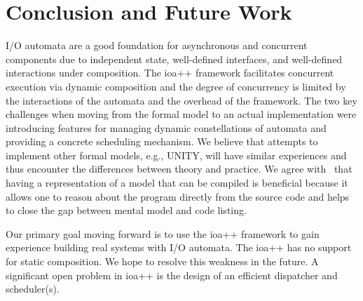 \section{Conclusion and Future Work\label{conclusion}}

I/O automata are a good foundation for asynchronous and concurrent components due to independent state, well-defined interfaces, and well-defined interactions under composition.
The ioa++ framework facilitates concurrent execution via dynamic composition and the degree of concurrency is limited by the interactions of the automata and the overhead of the framework.
The two key challenges when moving from the formal model to an actual implementation were introducing features for managing dynamic constellations of automata and providing a concrete scheduling mechanism.
We believe that attempts to implement other formal models, e.g., UNITY, will have similar experiences and thus encounter the differences between theory and practice.
We agree with~\cite{georgiou2009automated} that having a representation of a model that can be compiled is beneficial because it allows one to reason about the program directly from the source code and helps to close the gap between mental model and code listing.

Our primary goal moving forward is to use the ioa++ framework to gain experience building real systems with I/O automata.
The ioa++ has no support for static composition.
We hope to resolve this weakness in the future.
A significant open problem in ioa++ is the design of an efficient dispatcher and scheduler(s).

